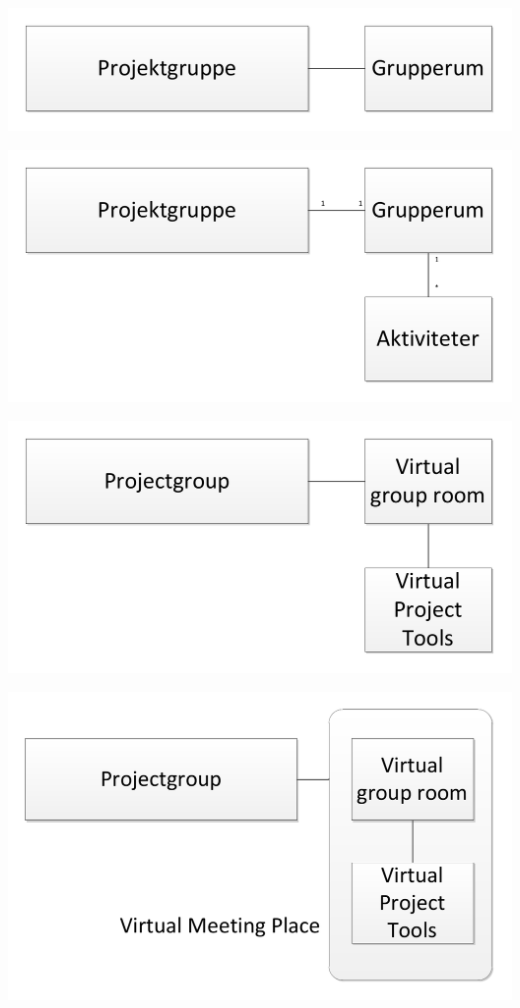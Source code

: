 \begin{frame}{\topictwo} 
\includegraphics[width=\columnwidth]{input/rasmus/topictwo8.pdf}
\end{frame}
\begin{frame}{\topictwo} 
\includegraphics[width=\columnwidth]{input/rasmus/topictwo9.pdf}
\end{frame}
\begin{frame}{\topictwo} 
\includegraphics[width=\columnwidth]{input/rasmus/topictwo10.pdf}
\end{frame}
\begin{frame}{\topictwo} 
\includegraphics[width=\columnwidth]{input/rasmus/topictwo11.pdf}
\end{frame}

